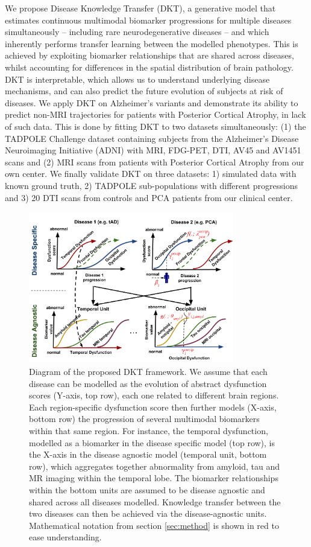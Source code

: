 \documentclass{llncs}
\begin{document}
We propose Disease Knowledge Transfer (DKT), a generative model that estimates continuous multimodal biomarker progressions for multiple diseases simultaneously -- including rare neurodegenerative diseases -- and which inherently performs transfer learning between the modelled phenotypes. This is achieved by exploiting biomarker relationships that are shared across diseases, whilst accounting for differences in the spatial distribution of brain pathology. DKT is interpretable, which allows us to understand underlying disease mechanisms, and can also predict the future evolution of subjects at risk of diseases. We apply DKT on Alzheimer's variants and demonstrate its ability to predict non-MRI trajectories for patients with Posterior Cortical Atrophy, in lack of such data. This is done by fitting DKT to two datasets simultaneously: (1) the TADPOLE Challenge \cite{marinescu2018tadpole} dataset containing subjects from the Alzheimer's Disease Neuroimaging Initiative (ADNI) with MRI, FDG-PET, DTI, AV45 and AV1451 scans and (2) MRI scans from patients with Posterior Cortical Atrophy from our own center. We finally validate DKT on three datasets: 1) simulated data with known ground truth, 2) TADPOLE sub-populations with different progressions and 3) 20 DTI scans from controls and PCA patients from our clinical center.

\begin{figure}[h]
 \centering
 \includegraphics[width=0.8\textwidth,trim=0 0 0 0,clip]{figures/disease_knowledge_transfer_symbols.pdf}
 \caption{Diagram of the proposed DKT framework. We assume that each disease can be modelled as the evolution of abstract dysfunction scores (Y-axis, top row), each one related to different brain regions. Each region-specific dysfunction score then further models (X-axis, bottom row) the progression of several multimodal biomarkers within that same region. For instance, the temporal dysfunction, modelled as a biomarker in the disease specific model (top row), is the X-axis in the disease agnostic model (temporal unit, bottom row), which aggregates together abnormality from amyloid, tau and MR imaging within the temporal lobe. The biomarker relationships within the bottom units are assumed to be disease agnostic and shared across all diseases modelled. Knowledge transfer between the two diseases can then be achieved via the disease-agnostic units. Mathematical notation from section \ref{sec:method} is shown in red to ease understanding.}
 \label{fig:diagram}
\end{figure}
\end{document}
